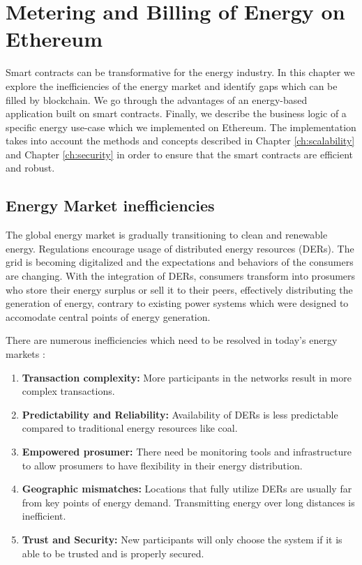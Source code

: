 \chapter{Metering and Billing of Energy on Ethereum}\label{ch:implementation}

Smart contracts can be transformative for the energy industry. In this chapter we explore the inefficiencies of the energy market and identify gaps which can be filled by blockchain. We go through the advantages of an energy-based application  built on smart contracts. Finally, we describe the business logic of a specific energy use-case which we implemented on Ethereum. The implementation takes into account the methods and concepts described in Chapter \ref{ch:scalability} and Chapter \ref{ch:security} in order to ensure that the smart contracts are efficient and robust.

\section{Energy Market inefficiencies}

The global energy market is gradually transitioning to clean and renewable energy. Regulations encourage usage of distributed energy resources (DERs). The grid is becoming digitalized and the expectations and behaviors of the consumers are changing. With the integration of DERs, consumers transform into prosumers who store their energy surplus or sell it to their peers, effectively distributing the generation of energy, contrary to existing power systems which were designed to accomodate central points of energy generation.

There are numerous inefficiencies which need to be resolved in today's energy markets \cite{ey-inefficiencies}:
\begin{enumerate}
    \item \textbf{Transaction complexity:} More participants in the networks result in more complex transactions.
    \item \textbf{Predictability and Reliability:} Availability of DERs is less predictable compared to traditional energy resources like coal. 
    \item \textbf{Empowered prosumer:} There need be monitoring tools and infrastructure to allow prosumers to have flexibility in their energy distribution.
    \item \textbf{Geographic mismatches:} Locations that fully utilize DERs are usually far from key points of energy demand. Transmitting energy over long distances is inefficient.
    \item \textbf{Trust and Security:} New participants will only choose the system if it is able to be trusted and is properly secured.
\end{enumerate}



